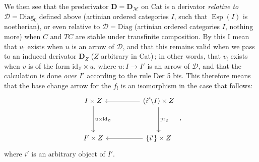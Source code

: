 \documentclass[11pt]{article}
\newcommand{\msp}[1]{\marginpar{\footnotesize [#1]}}
\newcommand{\Esp}{\operatorname{Esp}}
\newcommand{\id}{\mathrm{id}}
\newcommand{\pr}{\mathrm{pr}}
\newcommand{\M}{\mathcal{M}}
\begin{document}
We then see that the prederivator $\mathbf{D} = \mathbf{D}_{\M}$ on Cat is a derivator \textit{relative to} $\mathcal{D} = \mathrm{Diag}_0$ defined above (artinian ordered categories $I$, such that $\Esp(I)$ is noetherian), or even relative to $\mathcal{D} = \mathrm{Diag}$ (artinian ordered categories $I$, nothing more) when $C$ and $TC$ are stable under transfinite composition. By this I mean that $u_!$ exists when $u$ is an arrow of $\mathcal{D}$,
\msp{page 70}
and that this remains valid when we pass to an induced derivator $\mathbf{D}_Z$ ($Z$ arbitrary in Cat)\,; in other words, that $v_!$ exists when $v$ is of the form $\id_Z\times u$, where $u : I\longrightarrow I'$ is an %
arrow of $\mathcal{D}$, and that the calculation is done \textit{over} $I'$ according to the rule Der 5 bis. This therefore means that the base change arrow for the $f_!$ is an isomorphism in the case %
that follows:
\[
\begin{tikzcd}[row sep=huge, column sep=huge]
I\times Z \arrow[d, "u\times\id_Z"] & (i'\backslash I)\times Z \arrow[l] \arrow[d, "\pr_2"] \\
I'\times Z & \{i'\}\times Z \arrow[l]
\end{tikzcd}
\ ,
\]
where $i'$ is an arbitrary object of $I'$.
\end{document}

